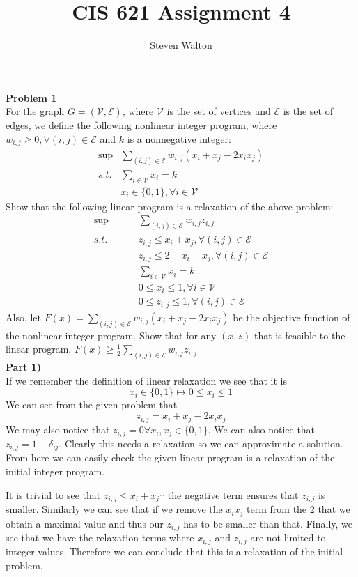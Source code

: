 \documentclass[12pt,letter]{article}
\newcommand{\problem}[1]{\vspace{3mm}\Large\textbf{{Problem {#1}\vspace{3mm}}}\normalsize\\}
\newcommand{\ppart}[1]{\vspace{2mm}\large\textbf{\\Part {#1})\vspace{2mm}}\normalsize\\}
\begin{document}
\title{CIS 621 Assignment 4}
\author{Steven Walton}
\maketitle
\problem{1}
For the graph $G=(\mathcal{V},\mathcal{E})$, where $\mathcal{V}$ is the set of 
vertices and $\mathcal{E}$ is the set of edges, we define the following
nonlinear integer program, where $w_{i,j}\geq0, \forall(i,j)\in\mathcal{E}$ and 
$k$ is a nonnegative integer:
\begin{align*}
    \sup&\sum\limits_{(i,j)\in\mathcal{E}} w_{i,j}(x_i + x_j - 2x_ix_j)\\
    s.t. & \sum\limits_{i\in\mathcal{V}}x_i = k\\
       & x_i\in\{0,1\}, \forall i \in\mathcal{V}
\end{align*}
Show that the following linear program is a relaxation of the above problem:
\begin{align*}
    \sup&\sum\limits_{(i,j)\in\mathcal{E}} w_{i,j}z_{i,j}\\
     s.t.\hspace{1cm} & z_{i,j}\leq x_i + x_j, \forall(i,j)\in\mathcal{E}\\
     & z_{i,j}\leq 2 - x_i - x_j, \forall(i,j) \in \mathcal{E}\\
     & \sum\limits_{i\in\mathcal{V}}x_i = k\\
     & 0 \leq x_i \leq 1, \forall i \in\mathcal{V}\\
     & 0 \leq z_{i,j} \leq 1, \forall(i,j)\in\mathcal{E}
\end{align*}
Also, let $F(x)=\sum\limits_{(i,j)\in\mathcal{E}}w_{i,j}(x_i + x_j - 2x_ix_j)$ be
the objective function of the nonlinear integer program. Show that for any 
$(x,z)$ that is feasible to the linear program, 
$F(x)\geq\frac12\sum\limits_{(i,j)\in\mathcal{E}}w_{i,j}z_{i,j}$
\ppart{1}
If we remember the definition of linear relaxation we see that it is
\[
    x_i\in\{0,1\} \mapsto 0\leq x_i \leq 1
\]
We can see from the given problem that 
\[
    z_{i,j} = x_i + x_j - 2x_ix_j
\]
We may also notice that $z_{i,j} = 0 \forall x_i,x_j\in\{0,1\}$. We can also 
notice that $z_{i,j} = 1-\delta_{ij}$. Clearly this
needs a relaxation so we can approximate a solution. From here we can easily 
check the given linear program is a relaxation of the initial integer program.

It is trivial to see that $z_{i,j}\leq x_i + x_j \because$ the negative term
ensures that $z_{i,j}$ is smaller. Similarly we can see that if we remove the 
$x_ix_j$ term from the 2 that we obtain a maximal value and thus our $z_{i,j}$
has to be smaller than that. Finally, we see that we have the relaxation terms
where $x_{i,j}$ and $z_{i,j}$ are not limited to integer values. Therefore we
can conclude that this is a relaxation of the initial problem.
\end{document}
